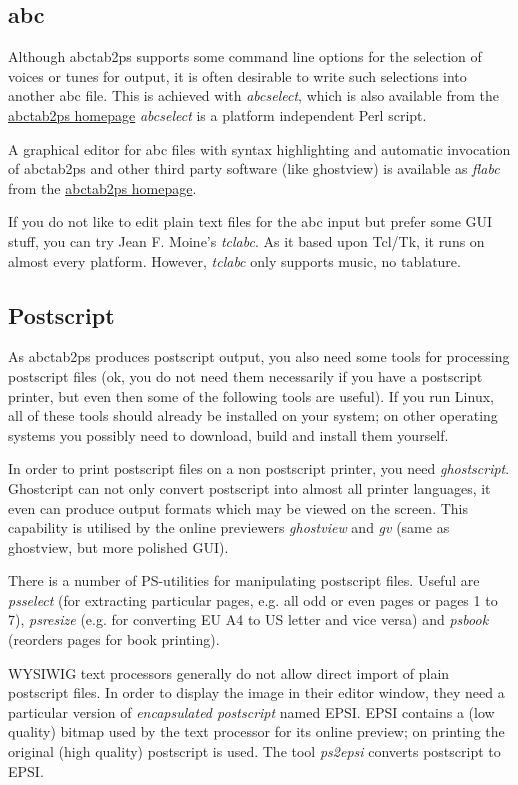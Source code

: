 \documentclass[a4paper]{article}
\begin{document}
\subsection{abc}
Although abctab2ps supports some command line options for the
selection of voices or tunes for output, it is often desirable
to write such selections into another abc file. This is achieved
with {\it abcselect}, which is also available from the
\href{http://www.lautengesellschaft.de/cdmm/}{abctab2ps homepage}
{\it abcselect} is a platform independent Perl script.
\par
A graphical editor for abc files with syntax highlighting and automatic
invocation of abctab2ps and other third party software (like ghostview)
is available as {\em flabc} from the \href{http://www.lautengesellschaft.de/cdmm/}{abctab2ps homepage}.
\par
If you do not like to edit plain text files for the abc input
but prefer some GUI stuff, you can try Jean F. Moine's {\it tclabc}.
As it based upon Tcl/Tk, it runs on almost every platform.
However, {\it tclabc} only supports music, no tablature.

\subsection{Postscript}
 
As abctab2ps produces postscript output, you also need some tools 
for processing postscript files (ok, you do not need them necessarily
if you have a postscript printer, but even then some of the following tools 
are useful). If you run Linux, all of these tools should already
be installed on your system; on other operating systems you
possibly need to download, build and install them yourself. 
\par
In order to print postscript files on a non postscript printer,
you need {\it ghostscript}. Ghostcript can not only convert postscript
into almost all printer languages, it even can produce output formats which
may be viewed on the screen. This capability is utilised by the online
previewers {\it ghostview} and {\it gv} (same as ghostview,
but more polished GUI).
\par
There is a number of PS-utilities for manipulating postscript files.
Useful are {\it psselect} (for extracting particular pages, e.g. all
odd or even pages or pages 1 to 7),
{\it psresize} (e.g. for converting EU A4 to US letter and 
vice versa) and {\it psbook} (reorders pages for book printing).
\par
WYSIWIG text processors generally do not allow direct import of plain 
postscript files. In order to display the image in their editor
window, they need a particular version of {\it encapsulated postscript}
named EPSI. EPSI contains a (low quality) bitmap used by the text 
processor for its online preview; on printing the original (high quality)
postscript is used. The tool {\it ps2epsi} converts postscript
to EPSI.
\end{document}
